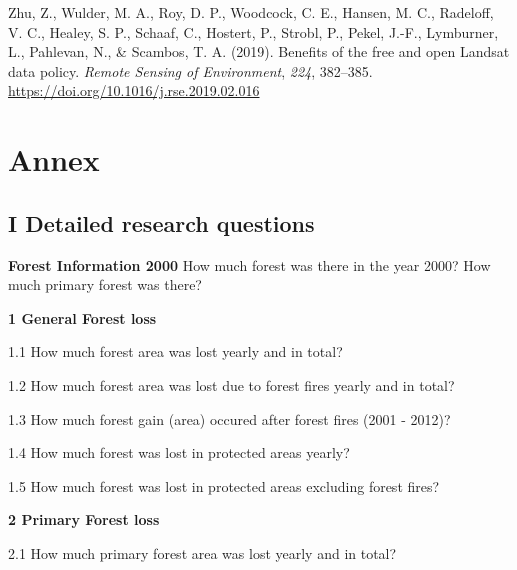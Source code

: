 \documentclass[
  letterpaper,
  DIV=11,
  numbers=noendperiod]{scrreprt}
\newlength{\cslhangindent}
\newlength{\cslentryspacingunit} %
\newenvironment{CSLReferences}[2] %
 {%
  \setlength{\parindent}{0pt}
  \ifodd #1
  \let\oldpar\par
  \def\par{\hangindent=\cslhangindent\oldpar}
  \fi
  \setlength{\parskip}{#2\cslentryspacingunit}
 }%
 {}
\begin{document}
\begin{CSLReferences}{1}{0}
\leavevmode{}%
Zhu, Z., Wulder, M. A., Roy, D. P., Woodcock, C. E., Hansen, M. C.,
Radeloff, V. C., Healey, S. P., Schaaf, C., Hostert, P., Strobl, P.,
Pekel, J.-F., Lymburner, L., Pahlevan, N., \& Scambos, T. A. (2019).
Benefits of the free and open {Landsat} data policy. \emph{Remote
Sensing of Environment}, \emph{224}, 382--385.
\url{https://doi.org/10.1016/j.rse.2019.02.016}

\end{CSLReferences}

\newpage

\listoffigures

\newpage

\listoftables


\hypertarget{annex}{%
\chapter*{Annex}\label{annex}}



\hypertarget{detailed-research-questions}{%
\section*{\texorpdfstring{\textsc{I} Detailed research
questions}{ Detailed research questions}}\label{detailed-research-questions}}


\textbf{Forest Information 2000} How much forest was there in the year
2000? How much primary forest was there?

\textbf{1 General Forest loss}

1.1 How much forest area was lost yearly and in total?

1.2 How much forest area was lost due to forest fires yearly and in
total?

1.3 How much forest gain (area) occured after forest fires (2001 -
2012)?

1.4 How much forest was lost in protected areas yearly?

1.5 How much forest was lost in protected areas excluding forest fires?

\textbf{2 Primary Forest loss}

2.1 How much primary forest area was lost yearly and in total?
\end{document}
